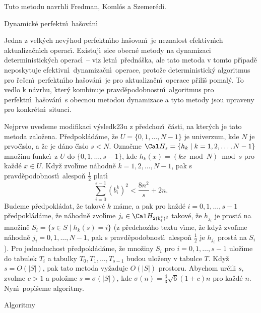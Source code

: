 \flushpar Tuto metodu navrhli Fredman, Koml\'os a Szemer\'edi.
\medskip

\subhead
Dynamick\'e perfektn\'\i\ ha\v sov\'an\'\i
\endsubhead
\smallskip

\flushpar Jedna z velk\'ych nev\'yhod perfektn\'\i ho ha\v sovan\'\i\ je 
neznalost efektivn\'\i ch aktualiza\v cn\'\i ch ope\-rac\'\i . Existuj\'\i\ sice 
obecn\'e meto\-dy na dynamizaci deterministick\'ych operac\'\i\ -- viz 
letn\'\i\ p\v redn\'a\v s\-ka, ale tato metoda v tomto p\v r\'\i pad\v e neposkytuje 
efektivn\'\i\ dynamiza\v cn\'\i\ operace, proto\v ze deterministick\'y 
algoritmus pro \v re\-\v se\-n\'\i\ perfektn\'\i ho ha\v sov\'an\'\i\ je pro 
aktualiza\v cn\'\i\ ope\-race p\v rili\v s pomal\'y. To vedlo k n\'avrhu, 
kter\'y kombinuje pravd\v epodobnostn\'\i\ algoritmus pro perfektn\'\i\ 
ha\v sov\'an\'\i\ s obecnou metodou dynami\-za\-ce a tyto metody jsou 
upraveny pro konkr\'etn\'\i\ situaci. 
\medskip

\flushpar Nejprve uvedeme modifikaci v\'ysledk\accent23u z 
p\v redchoz\'\i\ \v c\'asti, na kter\'ych je tato metoda zalo\v zena.
P\v redpokl\'ad\'ame, \v ze $U=\{0,1,\dots,N-1\}$ je univerzum, kde $
N$ je 
prvo\v c\'\i slo, a \v ze je d\'ano \v c\'\i slo $s<N$. Ozna\v cme 
$\Cal H_s=\{h_k\mid k=1,2,\dots,N-1\}$ mno\v zinu funkc\'\i\ z $U$ do 
$\{0,1,\dots,s-1\}$, kde $h_k(x)=(kx\bmod N)\bmod s$ pro ka\v zd\'e $
x\in U$. 
Kdy\v z zvol\'\i me n\'ahodn\v e $k=1,2,\dots,N-1$, pak s pravd\v epodobnost\'\i\ 
ales\-po\v n $\frac 12$ plat\'\i\ 
$$\sum_{i=0}^{s-1}(b_i^k)^2<\frac {8n^2}s+2n.$$
Budeme p\v redpokl\'adat, 
\v ze takov\'e $k$ m\'ame, a pak pro ka\v zd\'e $i=0,1,\dots,s-1$ 
p\v redpokl\'ad\'ame, \v ze n\'ahodn\v e zvol\'\i me $j_i\in \Cal H_{
2(b_i^k)^2}$ takov\'e, \v ze 
$h_{j_i}$ je prost\'a na mno\v zin\v e $S_i=\{s\in S\mid h_k(s)=i
\}$ (z p\v redchoz\'\i ho textu v\'\i me, \v ze kdy\v z zvol\'\i me n\'ahodn\v e 
$j_i=0,1,\dots,N-1$, pak s pravd\v epodobnost\'\i\ ales\-po\v n $\frac 
12$ je $h_{j_i}$ 
prost\'a na $S_i$). Pro jednoduchost p\v redpokl\'ad\'ame, \v ze mno\v ziny $
S_i$ 
pro $i=0,1,\dots,s-1$ ulo\v z\'\i me do tabulek $T_i$ a tabulky 
$T_0,T_1,\dots,T_{s-1}$ budou ulo\v zeny v tabulce $T$. Kdy\v z $
s=O(|S|)$, 
pak tato metoda vy\v zaduje $O(|S|)$ prostoru. Abychom ur\v cili $
s$, 
zvolme $c>1$ a polo\v zme $s=\sigma (|S|)$, kde $\sigma (n)=\frac 
43\sqrt 6(1+c)n$ pro 
ka\v zd\'e $n$. Nyn\'\i\ pop\'\i\v seme algoritmy. 
\medskip

\subhead
Algoritmy
\endsubhead
\smallskip

